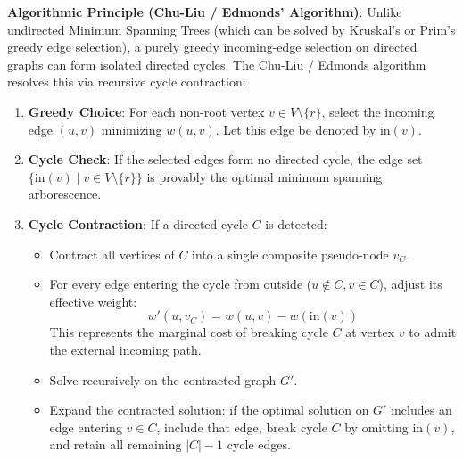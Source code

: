 \documentclass[12pt]{article}
\begin{document}
\textbf{Algorithmic Principle (Chu-Liu / Edmonds' Algorithm)}:
Unlike undirected Minimum Spanning Trees (which can be solved by Kruskal's or Prim's greedy edge selection), a purely greedy incoming-edge selection on directed graphs can form isolated directed cycles. The Chu-Liu / Edmonds algorithm resolves this via recursive cycle contraction:
\begin{enumerate}
    \item \textbf{Greedy Choice}: For each non-root vertex $v \in V \setminus \{r\}$, select the incoming edge $(u, v)$ minimizing $w(u, v)$. Let this edge be denoted by $\text{in}(v)$.
    \item \textbf{Cycle Check}: If the selected edges form no directed cycle, the edge set $\{\text{in}(v) \mid v \in V \setminus \{r\}\}$ is provably the optimal minimum spanning arborescence.
    \item \textbf{Cycle Contraction}: If a directed cycle $C$ is detected:
    \begin{itemize}
        \item Contract all vertices of $C$ into a single composite pseudo-node $v_C$.
        \item For every edge entering the cycle from outside ($u \notin C, v \in C$), adjust its effective weight:
        \[
        w'(u, v_C) = w(u, v) - w(\text{in}(v))
        \]
        This represents the marginal cost of breaking cycle $C$ at vertex $v$ to admit the external incoming path.
        \item Solve recursively on the contracted graph $G'$.
        \item Expand the contracted solution: if the optimal solution on $G'$ includes an edge entering $v \in C$, include that edge, break cycle $C$ by omitting $\text{in}(v)$, and retain all remaining $|C| - 1$ cycle edges.
    \end{itemize}
\end{enumerate}
\end{document}
